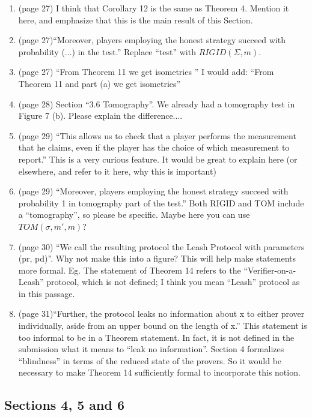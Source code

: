 \documentclass[12pt]{article}
\begin{document}
\begin{enumerate}
\item (page 27) I think that Corollary 12 is the same as Theorem 4. Mention it here, and emphasize that this is the main result of this Section.
\item (page 27)``Moreover, players employing the honest strategy succeed with probability (...) in the test.'' Replace ``test'' with $RIGID(\Sigma,m)$.
\item (page 27) ``From Theorem 11 we get isometries '' I would add: ``From Theorem 11 and part (a) we get isometries''
\item (page 28) Section ``3.6 Tomography''. We already had a tomography test in Figure 7 (b). Please explain the difference....
\item (page 29) ``This allows us
to check that a player performs the measurement that he claims, even if the player has the choice of which
measurement to report.'' This is a very curious feature. It would be great to explain here (or elsewhere, and refer to it here, why this is important)
\item (page 29) ``Moreover, players employing the honest strategy succeed with probability 1 in tomography part of the
test.'' Both RIGID and TOM include a ``tomography'', so please be specific. Maybe here you can use $TOM(\sigma,m',m)$?
\item (page 30) ``We call the resulting protocol the Leash Protocol with parameters (pr, pd)''. Why not make this into a figure? This will help make statements more formal. Eg. The statement of Theorem 14 refers to the ``Verifier-on-a-Leash'' protocol, which is not defined; I think you mean ``Leash'' protocol as in this passage.
    \item (page 31)``Further, the protocol leaks no information about x to either prover individually, aside from an upper bound
on the length of x.'' This statement is too informal to be in a Theorem statement. In fact, it is not defined in the submission what it means to ``leak no information''. Section 4 formalizes ``blindness'' in terms of the reduced state of the provers. So it would be necessary to make Theorem 14 sufficiently formal to incorporate this notion.

\end{enumerate}


\subsection*{Sections 4, 5 and 6}
\end{document}
